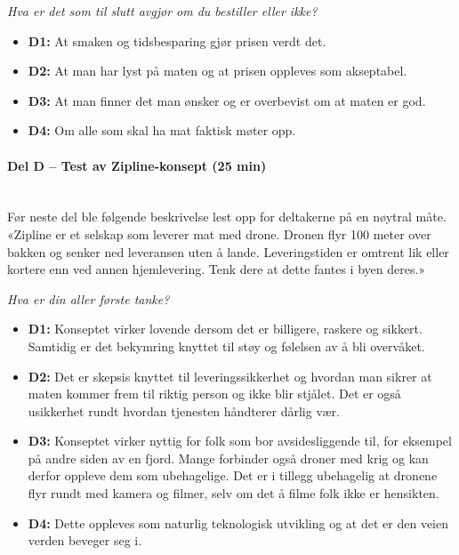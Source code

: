 \textit{Hva er det som til slutt avgjør om du bestiller eller ikke?}
\begin{itemize}[leftmargin=1.5em, nosep]
  \item \textbf{D1:} At smaken og tidsbesparing gjør prisen verdt det.
  \item \textbf{D2:} At man har lyst på maten og at prisen oppleves som
  akseptabel.
  \item \textbf{D3:} At man finner det man ønsker og er overbevist om at
  maten er god.
  \item \textbf{D4:} Om alle som skal ha mat faktisk møter opp.
\end{itemize}

\paragraph{Del D -- Test av Zipline-konsept (25 min)}\mbox{}\\
Før neste del ble følgende beskrivelse lest opp for deltakerne på en nøytral
måte. «Zipline er et selskap som leverer mat med drone. Dronen flyr 100 meter
over bakken og senker ned leveransen uten å lande. Leveringstiden er omtrent lik
eller kortere enn ved annen hjemlevering. Tenk dere at dette fantes i byen deres.»

\textit{Hva er din aller første tanke?}
\begin{itemize}[leftmargin=1.5em, nosep]
  \item \textbf{D1:} Konseptet virker lovende dersom det er billigere,
  raskere og sikkert. Samtidig er det bekymring knyttet til støy og følelsen
  av å bli overvåket.
  \item \textbf{D2:} Det er skepsis knyttet til
  leveringssikkerhet og hvordan man sikrer at maten kommer frem til riktig
  person og ikke blir stjålet. Det er også usikkerhet rundt hvordan
  tjenesten håndterer dårlig vær.
  \item \textbf{D3:} Konseptet virker nyttig for folk som bor avsidesliggende
  til, for eksempel på andre siden av en fjord. Mange forbinder også droner med
  krig og kan derfor oppleve dem som ubehagelige. Det er i tillegg ubehagelig at
  dronene flyr rundt med kamera og filmer, selv om det å filme folk ikke er hensikten.
  \item \textbf{D4:} Dette oppleves som naturlig teknologisk utvikling og at
  det er den veien verden beveger seg i.
\end{itemize}

